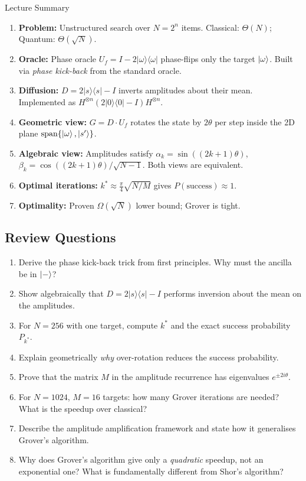 \documentclass[12pt,a4paper]{article}
\newcommand{\proj}[1]{\vert#1\rangle\langle#1\vert}
\begin{document}
\begin{algobox}{Lecture Summary}
\begin{enumerate}[leftmargin=1.5em]
  \item \textbf{Problem:} Unstructured search over $N=2^n$ items. Classical: $\Theta(N)$; Quantum: $\Theta(\sqrt N)$.

  \item \textbf{Oracle:} Phase oracle $U_f = I-2\proj\omega$ phase-flips only the target $\ket\omega$. Built via \emph{phase kick-back} from the standard oracle.

  \item \textbf{Diffusion:} $D = 2\proj s - I$ inverts amplitudes about their mean. Implemented as $H^{\otimes n}(2\proj 0 - I)H^{\otimes n}$.

  \item \textbf{Geometric view:} $G = D\cdot U_f$ rotates the state by $2\theta$ per step inside the 2D plane $\mathrm{span}\{\ket\omega,\ket{s'}\}$.

  \item \textbf{Algebraic view:} Amplitudes satisfy $\alpha_k = \sin((2k+1)\theta)$, $\beta_k = \cos((2k+1)\theta)/\!\sqrt{N-1}$. Both views are equivalent.

  \item \textbf{Optimal iterations:} $k^* \approx \frac\pi4\sqrt{N/M}$ gives $P(\text{success})\approx 1$.

  \item \textbf{Optimality:} Proven $\Omega(\sqrt N)$ lower bound; Grover is tight.
\end{enumerate}
\end{algobox}

\subsection*{Review Questions}

\begin{enumerate}
  \item Derive the phase kick-back trick from first principles. Why must the ancilla be in $\ket{-}$?
  \item Show algebraically that $D = 2\proj s - I$ performs inversion about the mean on the amplitudes.
  \item For $N=256$ with one target, compute $k^*$ and the exact success probability $P_{k^*}$.
  \item Explain geometrically \emph{why} over-rotation reduces the success probability.
  \item Prove that the matrix $M$ in the amplitude recurrence has eigenvalues $e^{\pm 2i\theta}$.
  \item For $N=1024$, $M=16$ targets: how many Grover iterations are needed? What is the speedup over classical?
  \item Describe the amplitude amplification framework and state how it generalises Grover's algorithm.
  \item Why does Grover's algorithm give only a \emph{quadratic} speedup, not an exponential one? What is fundamentally different from Shor's algorithm?
\end{enumerate}
\end{document}
